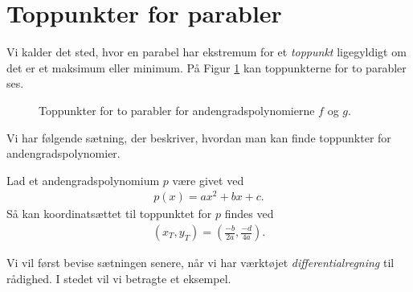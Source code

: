 \section*{Toppunkter for parabler}

Vi kalder det sted, hvor en parabel har ekstremum for et \textit{toppunkt} ligegyldigt om det er et maksimum eller minimum. På Figur \ref{fig:toppunkt} kan toppunkterne for to parabler ses.
\begin{figure}[H]
	\centering
	\caption{Toppunkter for to parabler for andengradspolynomierne $f$ og $g$.}
	\label{fig:toppunkt}
\end{figure}
Vi har følgende sætning, der beskriver, hvordan man kan finde toppunkter for andengradspolynomier. 
\begin{setn}
	Lad et andengradspolynomium $p$ være givet ved
	\begin{align*}
		p(x) = ax^2 + bx + c.
	\end{align*}
	Så kan koordinatsættet til toppunktet for $p$ findes ved
	\begin{align*}
		\left(x_T,y_T\right) = \left(\frac{-b}{2a}, \frac{-d}{4a} \right).
	\end{align*}
\end{setn}
Vi vil først bevise sætningen senere, når vi har værktøjet \textit{differentialregning} til rådighed. I stedet vil vi betragte et eksempel.
